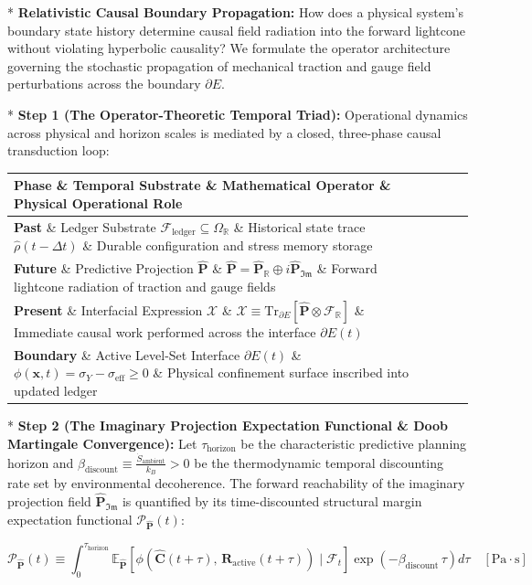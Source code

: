 \documentclass[11pt,a4paper]{article}
\theoremstyle{definition}\newtheorem{definition}{Definition}
\theoremstyle{remark}\newtheorem{remark}{Remark}
\begin{document}
* \textbf{Relativistic Causal Boundary Propagation:} How does a physical system's boundary state history determine causal field radiation into the forward lightcone without violating hyperbolic causality? We formulate the operator architecture governing the stochastic propagation of mechanical traction and gauge field perturbations across the boundary $\partial E$.

* \textbf{Step 1 (The Operator-Theoretic Temporal Triad):}
Operational dynamics across physical and horizon scales is mediated by a closed, three-phase causal transduction loop:

\begin{longtable}{llll}
\hline
Phase \& Temporal Substrate \& Mathematical Operator \& Physical Operational Role \\
\hline
\textbf{Past} \& Ledger Substrate $\mathcal{F}_{\text{ledger}} \subseteq \Omega_{\mathbb{R}}$ \& Historical state trace $\hat{\rho}(t - \Delta t)$ \& Durable configuration and stress memory storage \\
\textbf{Future} \& Predictive Projection $\hat{\mathbf{P}}$ \& $\hat{\mathbf{P}} = \hat{\mathbf{P}}_{\mathbb{R}} \oplus i\hat{\mathbf{P}}_{\mathfrak{Im}}$ \& Forward lightcone radiation of traction and gauge fields \\
\textbf{Present} \& Interfacial Expression $\boldsymbol{\mathcal{X}}$ \& $\boldsymbol{\mathcal{X}} \equiv \mathrm{Tr}_{\partial E}[\hat{\mathbf{P}} \otimes \mathcal{F}_{\mathbb{R}}]$ \& Immediate causal work performed across the interface $\partial E(t)$ \\
\textbf{Boundary} \& Active Level-Set Interface $\partial E(t)$ \& $\phi(\mathbf{x}, t) = \sigma_Y - \sigma_{\text{eff}} \ge 0$ \& Physical confinement surface inscribed into updated ledger \\
\hline
\end{longtable}
* \textbf{Step 2 (The Imaginary Projection Expectation Functional \& Doob Martingale Convergence):}
Let $\tau_{\text{horizon}}$ be the characteristic predictive planning horizon and $\beta_{\text{discount}} \equiv \frac{\dot{S}_{\text{ambient}}}{k_B} > 0$ be the thermodynamic temporal discounting rate set by environmental decoherence. The forward reachability of the imaginary projection field $\hat{\mathbf{P}}_{\mathfrak{Im}}$ is quantified by its time-discounted structural margin expectation functional $\mathcal{P}_{\hat{\mathbf{P}}}(t)$:


\begin{equation}
\boxed{\mathcal{P}_{\hat{\mathbf{P}}}(t) \equiv \int_0^{\tau_{\text{horizon}}} \mathbb{E}_{\hat{\mathbf{P}}}[ \phi\left(\hat{\mathbf{C}}(t + \tau), \, \mathbf{R}_{\text{active}}(t + \tau)\right) \;\Big|\; \mathcal{F}_t ] \exp\left( -\beta_{\text{discount}} \, \tau \right) d\tau \quad [\mathrm{Pa \cdot s}]}
\end{equation}
\end{document}

